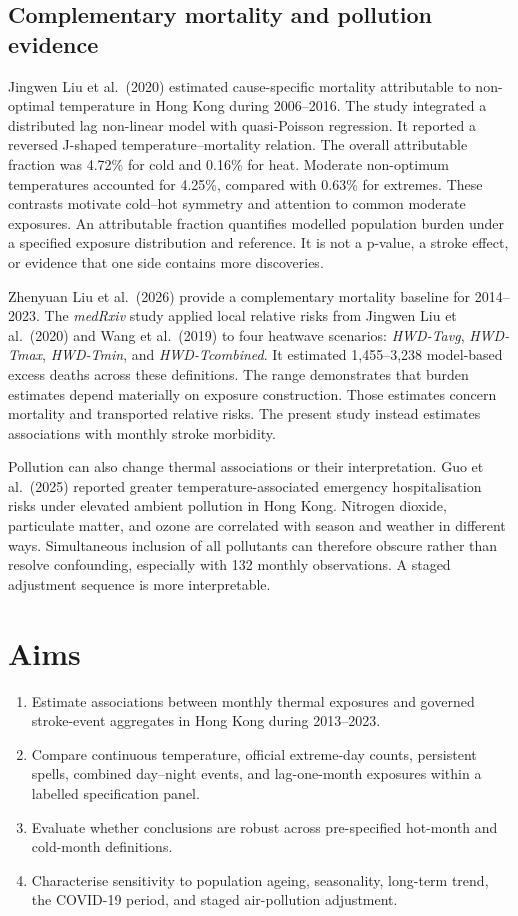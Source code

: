 \documentclass[11pt,a4paper]{article}
\begin{document}
\subsection{Complementary mortality and pollution evidence}

Jingwen Liu et al.\ (2020) estimated cause-specific mortality attributable to non-optimal temperature in Hong Kong during 2006--2016. The study integrated a distributed lag non-linear model with quasi-Poisson regression. It reported a reversed J-shaped temperature--mortality relation. The overall attributable fraction was 4.72\% for cold and 0.16\% for heat. Moderate non-optimum temperatures accounted for 4.25\%, compared with 0.63\% for extremes. These contrasts motivate cold--hot symmetry and attention to common moderate exposures. An attributable fraction quantifies modelled population burden under a specified exposure distribution and reference. It is not a p-value, a stroke effect, or evidence that one side contains more discoveries.

Zhenyuan Liu et al.\ (2026) provide a complementary mortality baseline for 2014--2023. The \emph{medRxiv} study applied local relative risks from Jingwen Liu et al.\ (2020) and Wang et al.\ (2019) to four heatwave scenarios: \emph{HWD-Tavg}, \emph{HWD-Tmax}, \emph{HWD-Tmin}, and \emph{HWD-Tcombined}. It estimated 1,455--3,238 model-based excess deaths across these definitions. The range demonstrates that burden estimates depend materially on exposure construction. Those estimates concern mortality and transported relative risks. The present study instead estimates associations with monthly stroke morbidity.

Pollution can also change thermal associations or their interpretation. Guo et al.\ (2025) reported greater temperature-associated emergency hospitalisation risks under elevated ambient pollution in Hong Kong. Nitrogen dioxide, particulate matter, and ozone are correlated with season and weather in different ways. Simultaneous inclusion of all pollutants can therefore obscure rather than resolve confounding, especially with 132 monthly observations. A staged adjustment sequence is more interpretable.

\section{Aims}

\begin{enumerate}
  \item Estimate associations between monthly thermal exposures and governed stroke-event aggregates in Hong Kong during 2013--2023.
  \item Compare continuous temperature, official extreme-day counts, persistent spells, combined day--night events, and lag-one-month exposures within a labelled specification panel.
  \item Evaluate whether conclusions are robust across pre-specified hot-month and cold-month definitions.
  \item Characterise sensitivity to population ageing, seasonality, long-term trend, the COVID-19 period, and staged air-pollution adjustment.
\end{enumerate}
\end{document}
